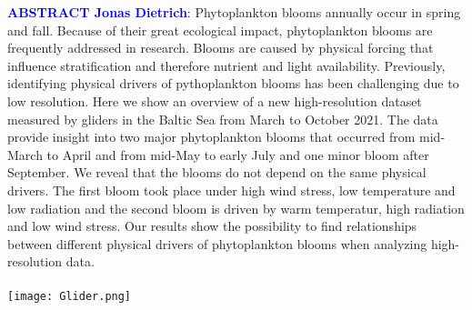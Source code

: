 \documentclass[../Main.tex]{subfiles}
\begin{document}
\begin{tcolorbox}[colback=light-orange, boxrule=0pt]
  \begin{multicols}{3}
    \textcolor{blue}{\textbf{ABSTRACT \scriptsize{Jonas Dietrich}}:}
Phytoplankton blooms annually occur in spring and fall.
Because of their great ecological impact, phytoplankton blooms are frequently addressed in research.
Blooms are caused by physical forcing that influence stratification and therefore nutrient and light availability.
Previously, identifying physical drivers of pythoplankton blooms has been challenging due to low resolution.
%
Here we show an overview of a new high-resolution dataset measured by gliders in the Baltic Sea from March to October 2021.
The data provide insight into two major phytoplankton blooms that occurred from mid-March to April and from mid-May to early July and one minor bloom after September.
We reveal that the blooms do not depend on the same physical drivers.
The first bloom took place under high wind stress, low temperature and low radiation and the second bloom is driven by warm temperatur, high radiation and low wind stress.
Our results show the possibility to find relationships between different physical drivers of phytoplankton blooms when analyzing high-resolution data.
\ \\
\ \\
    \texttt{[image: Glider.png]}
 \end{multicols}
\end{tcolorbox}
\end{document}
